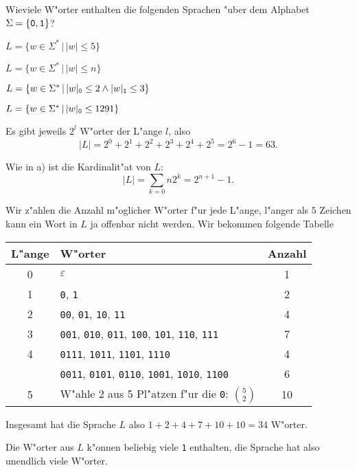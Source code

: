 Wieviele W"orter enthalten die folgenden Sprachen "uber dem Alphabet 
$\Sigma=\{{\tt 0}, {\tt 1}\}$?
\begin{teilaufgaben}
\item $L=\{ w\in\Sigma^*\,|\, |w|\le 5\}$
\item $L=\{ w\in\Sigma^*\,|\, |w|\le n\}$
\item $L=\{ w\in\Sigma^*\,|\,
|w|_{\tt 0}\le 2
\wedge
|w|_{\tt 1}\le 3
\}$
\item $L=\{ w\in\Sigma^*\,|\, |w|_{\tt 0}\le 1291\}$
\end{teilaufgaben}

\begin{loesung}
\begin{teilaufgaben}
\item
Es gibt jeweils $2^l$ W"orter der L"ange $l$, also
\[
|L|=2^0 + 2^1+2^2+2^3+2^4+2^5=2^6-1=63.
\]
\item
Wie in a) ist die Kardinalit"at von $L$:
\[
|L|=\sum_{k=0}n2^k=2^{n+1}-1.
\]
\item
Wir z"ahlen die Anzahl m"oglicher W"orter f"ur jede L"ange, l"anger als
$5$ Zeichen kann ein Wort in $L$ ja offenbar nicht werden. Wir bekommen
folgende Tabelle
\begin{center}
\begin{tabular}{|c|l|c|}
\hline
L"ange&W"orter&Anzahl\\
\hline
0&$\varepsilon$&1\\
1&{\tt 0}, {\tt 1}&2\\
2&{\tt 00}, {\tt 01}, {\tt 10}, {\tt 11}&4\\
3&{\tt 001}, {\tt 010}, {\tt 011}, {\tt 100}, {\tt 101}, {\tt 110}, {\tt 111}&7\\
4&{\tt 0111}, {\tt 1011}, {\tt 1101}, {\tt 1110}&4\\
 &{\tt 0011}, {\tt 0101}, {\tt 0110}, {\tt 1001}, {\tt 1010}, {\tt 1100}&6\\
5&W"ahle 2 aus 5 Pl"atzen f"ur die {\tt 0}: $\binom{5}{2}$&10\\
\hline
\end{tabular}
\end{center}
Insgesamt hat die Sprache $L$ also $1+2+4+7+10+10=34$ W"orter.
\item Die W"orter aus $L$ k"onnen beliebig viele {\tt 1} enthalten,
die Sprache hat also unendlich viele W"orter.
\end{teilaufgaben}
\end{loesung}
